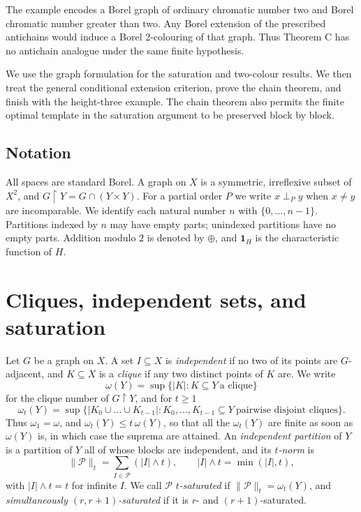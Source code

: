 \documentclass[11pt,reqno]{amsart}
\theoremstyle{plain}
\theoremstyle{definition}
\theoremstyle{remark}
\newcommand{\restr}{\mathbin{\upharpoonright}}
\newcommand{\cl}{\omega}
\begin{document}
The example encodes a Borel graph of ordinary chromatic number two
and Borel chromatic number greater than two. Any Borel extension of
the prescribed antichains would induce a Borel $2$-colouring of that
graph. Thus Theorem C has no antichain analogue under the same finite
hypothesis.

We use the graph formulation for the saturation and two-colour
results. We then treat the general conditional extension criterion,
prove the chain theorem, and finish with the height-three example.
The chain theorem also permits the finite optimal template in the
saturation argument to be preserved block by block.

\subsection*{Notation}
All spaces are standard Borel. A graph on $X$ is a symmetric,
irreflexive subset of $X^2$, and $G\restr Y=G\cap(Y\times Y)$.
For a partial order $P$ we write $x\perp_Py$ when $x\ne y$ are
incomparable. We identify each natural number $n$ with
$\{0,\ldots,n-1\}$. Partitions indexed by $n$ may have empty
parts; unindexed partitions have no empty parts. Addition modulo
$2$ is denoted by $\oplus$, and $\mathbf1_H$ is the characteristic
function of $H$.

\section{Cliques, independent sets, and saturation}
\label{sec:prelim}

Let $G$ be a graph on $X$. A set $I\subseteq X$ is \emph{independent} if no two
of its points are $G$-adjacent, and $K\subseteq X$ is a \emph{clique} if any two
distinct points of $K$ are. We write
\[
\cl(Y)=\sup\{|K|:K\subseteq Y\ \text{a clique}\}
\]
for the clique number of $G\restr Y$, and for $t\ge1$
\[
\cl_t(Y)=\sup\bigl\{|K_0\cup\dots\cup K_{t-1}|:
K_0,\dots,K_{t-1}\subseteq Y\ \text{pairwise disjoint cliques}\bigr\}.
\]
Thus $\cl_1=\cl$, and $\cl_t(Y)\le t\,\cl(Y)$, so that all the $\cl_t(Y)$ are
finite as soon as $\cl(Y)$ is, in which case the suprema are attained. An
\emph{independent partition} of $Y$ is a partition of $Y$ all of whose blocks
are independent, and its \emph{$t$-norm} is
\[
\lVert\mathcal P\rVert_t=\sum_{I\in\mathcal P}(|I|\wedge t),
\qquad |I|\wedge t=\min(|I|,t),
\]
with $|I|\wedge t=t$ for infinite $I$. We call $\mathcal P$ \emph{$t$-saturated}
if $\lVert\mathcal P\rVert_t=\cl_t(Y)$, and \emph{simultaneously
$(r,r{+}1)$-saturated} if it is $r$- and $(r{+}1)$-saturated.
\end{document}
